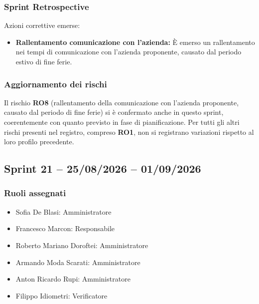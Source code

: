 \subsubsection{Sprint Retrospective}
Azioni correttive emerse:
\begin{itemize}
    \item \textbf{Rallentamento comunicazione con l'azienda:} È emerso un rallentamento nei tempi di comunicazione con l'azienda proponente, causato dal periodo estivo di fine ferie.
\end{itemize}
 
\subsubsection{Aggiornamento dei rischi}
Il rischio \textbf{RO8} (rallentamento della comunicazione con l'azienda proponente, causato dal periodo di fine ferie) si è confermato anche in questo sprint, coerentemente con quanto previsto in fase di pianificazione. Per tutti gli altri rischi presenti nel registro, compreso \textbf{RO1}, non si registrano variazioni rispetto al loro profilo precedente.

\subsection{Sprint 21 -- 25/08/2026 -- 01/09/2026}
\label{sec:sprint21}

\subsubsection{Ruoli assegnati}
\begin{itemize}
    \item Sofia De Blasi: Amministratore
    \item Francesco Marcon: Responsabile
    \item Roberto Mariano Doroftei: Amministratore
    \item Armando Moda Scarati: Amministratore
    \item Anton Ricardo Rupi: Amministratore
    \item Filippo Idiometri: Verificatore
\end{itemize}

